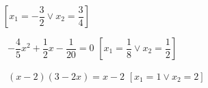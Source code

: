 \begin{esercizio}[\Ast]
\begin{multicols}{2}
\begin{enumeratea}
  \hfill$\left[x_{1} =-\dfrac{3}{2} \vee x_{2} = \dfrac{3}{4}\right]$
 \item~$- \dfrac{4}{5} x^{2} + \dfrac{1}{2} x-\dfrac{1}{20}=0$
  \hfill$\left[x_{1} = \dfrac{1}{8} \vee x_{2} = \dfrac{1}{2}\right]$
 \item~$(x-2) (3-2 x) = x-2$
  \hfill$\left[x_{1} = 1 \vee x_{2} = 2\right]$
 \end{enumeratea}
 \end{multicols}
\end{esercizio}

